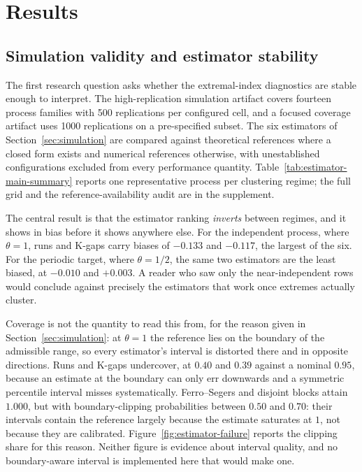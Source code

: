 \section{Results}
\label{sec:results}

\subsection{Simulation validity and estimator stability}

The first research question asks whether the extremal-index diagnostics are stable enough to interpret. The high-replication simulation artifact covers fourteen process families with 500 replications per configured cell, and a focused coverage artifact uses 1000 replications on a pre-specified subset. The six estimators of Section~\ref{sec:simulation} are compared against theoretical references where a closed form exists and numerical references otherwise, with unestablished configurations excluded from every performance quantity. Table~\ref{tab:estimator-main-summary} reports one representative process per clustering regime; the full grid and the reference-availability audit are in the supplement.

The central result is that the estimator ranking \emph{inverts} between regimes, and it shows in bias before it shows anywhere else. For the independent process, where \(\theta = 1\), runs and K-gaps carry biases of \(-0.133\) and \(-0.117\), the largest of the six. For the periodic target, where \(\theta = 1/2\), the same two estimators are the least biased, at \(-0.010\) and \(+0.003\). A reader who saw only the near-independent rows would conclude against precisely the estimators that work once extremes actually cluster.

Coverage is not the quantity to read this from, for the reason given in Section~\ref{sec:simulation}: at \(\theta = 1\) the reference lies on the boundary of the admissible range, so every estimator's interval is distorted there and in opposite directions. Runs and K-gaps undercover, at \(0.40\) and \(0.39\) against a nominal \(0.95\), because an estimate at the boundary can only err downwards and a symmetric percentile interval misses systematically. Ferro--Segers and disjoint blocks attain \(1.000\), but with boundary-clipping probabilities between \(0.50\) and \(0.70\): their intervals contain the reference largely because the estimate saturates at \(1\), not because they are calibrated. Figure~\ref{fig:estimator-failure} reports the clipping share for this reason. Neither figure is evidence about interval quality, and no boundary-aware interval is implemented here that would make one.

